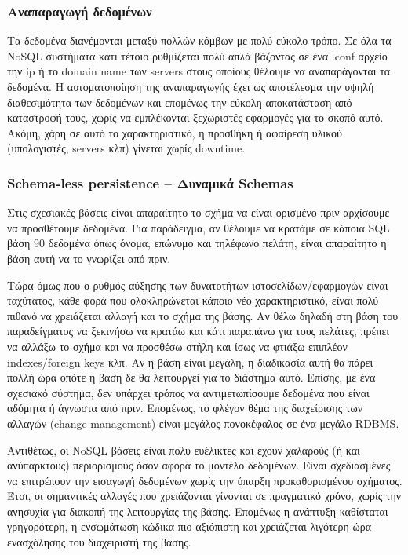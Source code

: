 		\subsubsection{Αναπαραγωγή δεδομένων}
		Τα δεδομένα διανέμονται μεταξύ πολλών κόμβων με πολύ εύκολο τρόπο. Σε όλα τα NoSQL συστήματα κάτι τέτοιο ρυθμίζεται πολύ απλά βάζοντας σε ένα .conf αρχείο την ip ή το domain name των servers στους οποίους θέλουμε να αναπαράγονται τα δεδομένα. Η αυτοματοποίηση της αναπαραγωγής έχει ως αποτέλεσμα την υψηλή διαθεσιμότητα των δεδομένων και επομένως την εύκολη αποκατάσταση από καταστροφή τους, χωρίς να εμπλέκονται ξεχωριστές εφαρμογές για το σκοπό αυτό. Ακόμη, χάρη σε αυτό το χαρακτηριστικό, η προσθήκη ή αφαίρεση υλικού (υπολογιστές, servers κλπ) γίνεται χωρίς downtime\cite{stonebraker2010sql}.
		
		\subsubsection{Schema-less persistence – Δυναμικά Schemas}
		Στις σχεσιακές βάσεις είναι απαραίτητο το σχήμα να είναι ορισμένο πριν αρχίσουμε να προσθέτουμε δεδομένα. Για παράδειγμα, αν θέλουμε να κρατάμε σε κάποια SQL βάση  90 δεδομένα όπως όνομα, επώνυμο και τηλέφωνο πελάτη, είναι απαραίτητο η βάση αυτή να το γνωρίζει από πριν.
		
		Τώρα όμως που ο ρυθμός αύξησης των δυνατοτήτων ιστοσελίδων/εφαρμογών είναι ταχύτατος, κάθε φορά που ολοκληρώνεται κάποιο νέο χαρακτηριστικό, είναι πολύ πιθανό να χρειάζεται αλλαγή και το σχήμα της βάσης. Αν θέλω δηλαδή στη βάση του παραδείγματος να ξεκινήσω να κρατάω και κάτι παραπάνω για τους πελάτες, πρέπει να αλλάξω το σχήμα και να προσθέσω στήλη και ίσως να φτιάξω επιπλέον indexes/foreign keys κλπ. Αν η βάση είναι μεγάλη, η διαδικασία αυτή θα πάρει πολλή ώρα οπότε η βάση δε θα λειτουργεί για το διάστημα αυτό. Επίσης, με ένα σχεσιακό σύστημα, δεν υπάρχει τρόπος να αντιμετωπίσουμε δεδομένα που είναι αδόμητα ή άγνωστα από πριν. Επομένως, το φλέγον θέμα της διαχείρισης των αλλαγών (change management) είναι μεγάλος πονοκέφαλος σε ένα μεγάλο RDBMS.
		
		Αντιθέτως, οι NoSQL βάσεις είναι πολύ ευέλικτες και έχουν χαλαρούς (ή και ανύπαρκτους) περιορισμούς όσον αφορά το μοντέλο δεδομένων. Είναι σχεδιασμένες να επιτρέπουν την εισαγωγή δεδομένων χωρίς την ύπαρξη προκαθορισμένου σχήματος. Έτσι, οι σημαντικές αλλαγές που χρειάζονται γίνονται σε πραγματικό χρόνο, χωρίς την ανησυχία για διακοπή της λειτουργίας της βάσης. Επομένως η ανάπτυξη καθίσταται γρηγορότερη, η ενσωμάτωση κώδικα πιο αξιόπιστη και χρειάζεται λιγότερη ώρα ενασχόλησης του διαχειριστή της βάσης\cite{stonebraker2010sql}.
		

